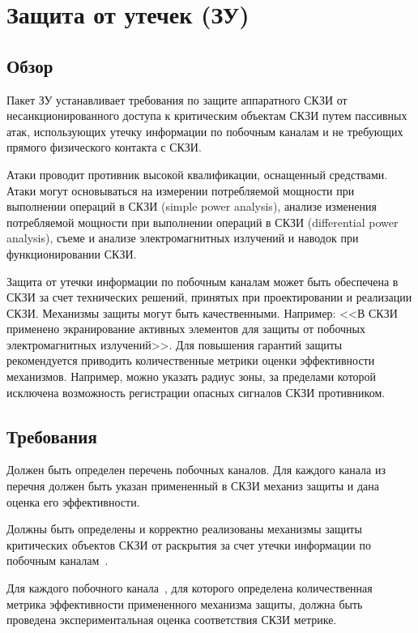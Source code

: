 \section{Защита от утечек (ЗУ)}\label{NI}

\subsection{Обзор}\label{NI.Intro}

Пакет ЗУ устанавливает требования по защите аппаратного СКЗИ от несанкционированного 
доступа к критическим объектам СКЗИ путем пассивных атак, использующих утечку 
информации по побочным каналам и не требующих прямого физического контакта с 
СКЗИ. 

Атаки проводит противник высокой квалификации, оснащенный 
 средствами. Атаки могут основываться на измерении 
потребляемой  мощности при выполнении операций в СКЗИ (simple power analysis), 
анализе изменения потребляемой мощности при выполнении операций в СКЗИ 
(differential power analysis), съеме и анализе электромагнитных излучений и 
наводок при функционировании СКЗИ.

Защита от утечки информации по побочным каналам может быть обеспечена в СКЗИ за 
счет технических решений, принятых при проектировании и реализации СКЗИ. 
%
Механизмы защиты могут быть качественными. Например: 
<<В СКЗИ применено экранирование активных элементов для защиты от побочных 
электромагнитных излучений>>. 
%
Для повышения гарантий защиты рекомендуется приводить количественные метрики 
оценки эффективности механизмов. Например, можно указать радиус зоны, 
за пределами которой исключена возможность регистрации опасных сигналов 
СКЗИ противником.

\subsection{Требования}\label{NI.Reqs}


\label{R.NI.Channels}
Должен быть определен перечень побочных каналов. Для каждого канала из перечня
должен быть указан примененный в СКЗИ механиз защиты и дана оценка его
эффективности.
                             	

\label{R.NI.Protect}
Должны быть определены и корректно реализованы механизмы защиты критических 
объектов СКЗИ от раскрытия за счет утечки информации по побочным 
каналам~. 


\label{R.NI.Estimate}
Для каждого побочного канала~, для которого определена 
количественная метрика эффективности примененного механизма защиты, 
должна быть проведена экспериментальная оценка соответствия СКЗИ 
метрике.

